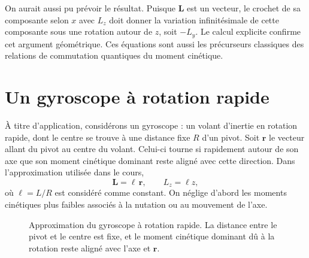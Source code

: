 On aurait aussi pu prévoir le résultat. Puisque \(\boldsymbol L\) est un vecteur, le crochet de sa composante selon \(x\) avec \(L_z\) doit donner la variation infinitésimale de cette composante sous une rotation autour de \(z\), soit \(-L_y\). Le calcul explicite confirme cet argument géométrique. Ces équations sont aussi les précurseurs classiques des relations de commutation quantiques du moment cinétique.

\section{Un gyroscope à rotation rapide}

À titre d’application, considérons un gyroscope : un volant d’inertie en rotation rapide, dont le centre se trouve à une distance fixe \(R\) d’un pivot. Soit \(\boldsymbol r\) le vecteur allant du pivot au centre du volant. Celui-ci tourne si rapidement autour de son axe que son moment cinétique dominant reste aligné avec cette direction. Dans l’approximation utilisée dans le cours,
\begin{equation}
  \boldsymbol L=\ell\,\boldsymbol r,
  \qquad
  L_z=\ell z,
  \label{eq:l8-L-parallel-r}
\end{equation}
où \(\ell=L/R\) est considéré comme constant. On néglige d’abord les moments cinétiques plus faibles associés à la nutation ou au mouvement de l’axe.

\begin{figure}[htbp]
  \centering
  \caption{Approximation du gyroscope à rotation rapide. La distance entre le pivot et le centre est fixe, et le moment cinétique dominant dû à la rotation reste aligné avec l’axe et \(\boldsymbol r\).}
\end{figure}

